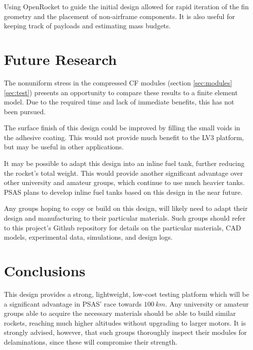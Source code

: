 \documentclass{aiaa-tc}%
\begin{document}
Using OpenRocket to guide the initial design allowed for rapid iteration of the fin geometry and the placement of non-airframe components. 
It is also useful for keeping track of payloads and estimating mass budgets.

\section{Future Research}

The nonuniform stress in the compressed CF modules (section \ref{sec:modules} \ref{sec:test}) presents an opportunity to compare these results to a finite element model. 
Due to the required time and lack of immediate benefits, this has not been pursued.

The surface finish of this design could be improved by filling the small voids in the adhesive coating. 
This would not provide much benefit to the LV3 platform, but may be useful in other applications.

It may be possible to adapt this design into an inline fuel tank, further reducing the rocket's total weight.
This would provide another significant advantage over other university and amateur groups, which continue to use much heavier tanks.
PSAS plans to develop inline fuel tanks based on this design in the near future. 

Any groups hoping to copy or build on this design, will likely need to adapt their design and manufacturing to their particular materials. 
Such groups should refer to this project's Github repository\cite{LV3repo} for details on the particular materials, CAD models, experimental data, simulations, and design logs.


\section{Conclusions}

This design provides a strong, lightweight, low-cost testing platform which will be a significant advantage in PSAS' race towards $\SI{100}{km}$.
Any university or amateur groups able to acquire the necessary materials should be able to build similar rockets, reaching much higher altitudes without upgrading to larger motors. 
It is strongly advised, however, that such groups thoroughly inspect their modules for delaminations, since these will compromise their strength. 
\end{document}
